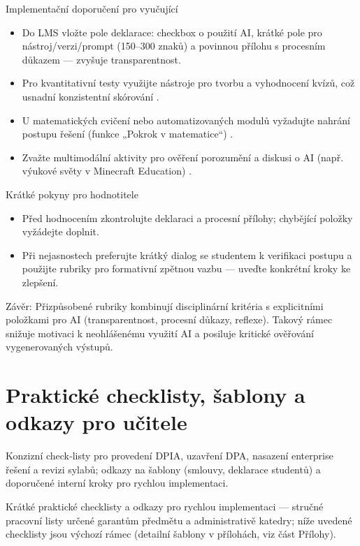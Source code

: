 \documentclass{report}%
\begin{document}
Implementační doporučení pro vyučující
\begin{itemize}
\item Do LMS vložte pole deklarace: checkbox o použití AI, krátké pole pro nástroj/verzi/prompt (150–300 znaků) a povinnou přílohu s procesním důkazem — zvyšuje transparentnost.
\item Pro kvantitativní testy využijte nástroje pro tvorbu a vyhodnocení kvízů, což usnadní konzistentní skórování \cite{kb_ai_101_tipu_pdf_page_36_1}.
\item U matematických cvičení nebo automatizovaných modulů vyžadujte nahrání postupu řešení (funkce „Pokrok v matematice“) \cite{kb_ai_101_tipu_pdf_page_8_1}.
\item Zvažte multimodální aktivity pro ověření porozumění a diskusi o AI (např. výukové světy v Minecraft Education) \cite{kb_ai_101_tipu_pdf_page_15_2}.
\end{itemize}

Krátké pokyny pro hodnotitele
\begin{itemize}
\item Před hodnocením zkontrolujte deklaraci a procesní přílohy; chybějící položky vyžádejte doplnit.
\item Při nejasnostech preferujte krátký dialog se studentem k verifikaci postupu a použijte rubriky pro formativní zpětnou vazbu — uveďte konkrétní kroky ke zlepšení.
\end{itemize}

Závěr: Přizpůsobené rubriky kombinují disciplinární kritéria s explicitními položkami pro AI (transparentnost, procesní důkazy, reflexe). Takový rámec snižuje motivaci k neohlášenému využití AI a posiluje kritické ověřování vygenerovaných výstupů.%

%
\section{Praktické checklisty, šablony a odkazy pro učitele}%
Konzizní check‑listy pro provedení DPIA, uzavření DPA, nasazení enterprise řešení a revizi sylabů; odkazy na šablony (smlouvy, deklarace studentů) a doporučené interní kroky pro rychlou implementaci.%


%
Krátké praktické checklisty a odkazy pro rychlou implementaci — stručné pracovní listy určené garantům předmětu a administrativě katedry; níže uvedené checklisty jsou výchozí rámec (detailní šablony v přílohách, viz část Přílohy).

\medskip
\end{document}
